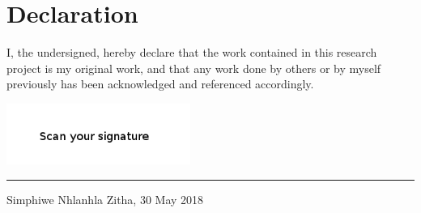 \vfill
\newpage
\section*{Declaration}
I, the undersigned, hereby declare that the work contained in this research project is my original work, and that any work done by others or by myself previously has been acknowledged and referenced accordingly.

\includegraphics[height=2cm]{images/signature.png} \newline \hrule
Simphiwe Nhlanhla Zitha, 30 May 2018

